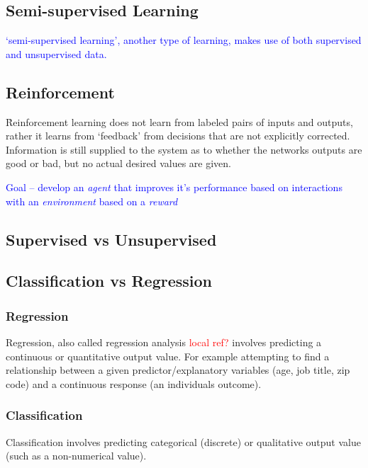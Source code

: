 \subsection{Semi-supervised Learning}

\textcolor{blue}{`semi-supervised learning', another type of learning, makes use of both supervised and unsupervised data.}

\subsection{Reinforcement}

\r{Reinforcement learning does not learn from labeled pairs of inputs and outputs, rather it learns from `feedback' from decisions that are not explicitly corrected. Information is still supplied to the system as to whether the networks outputs are good or bad, but no actual desired values are given.}

\textcolor{blue}{Goal -- develop an \emph{agent} that improves it's performance based on interactions with an \emph{environment} based on a \emph{reward}}

\subsection{Supervised vs Unsupervised}

\subsection{Classification vs Regression}

\subsubsection{Regression} 

Regression, also called regression analysis \textcolor{red}{local ref?} involves predicting a continuous or quantitative output value. For example attempting to find a relationship between a given predictor/explanatory variables (age, job title, zip code) and a continuous response (an individuals outcome).

\subsubsection{Classification} 

Classification involves predicting categorical (discrete) or qualitative output value (such as a non-numerical value). 


